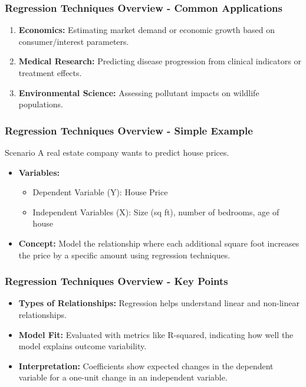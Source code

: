 \documentclass[aspectratio=169]{beamer}
\begin{document}
\begin{frame}[fragile]
    \frametitle{Regression Techniques Overview - Common Applications}
    \begin{enumerate}
        \item \textbf{Economics:} Estimating market demand or economic growth based on consumer/interest parameters.
        \item \textbf{Medical Research:} Predicting disease progression from clinical indicators or treatment effects.
        \item \textbf{Environmental Science:} Assessing pollutant impacts on wildlife populations.
    \end{enumerate}
\end{frame}

\begin{frame}[fragile]
    \frametitle{Regression Techniques Overview - Simple Example}
    \begin{block}{Scenario}
        A real estate company wants to predict house prices.
    \end{block}
    \begin{itemize}
        \item \textbf{Variables:}
            \begin{itemize}
                \item Dependent Variable (Y): House Price
                \item Independent Variables (X): Size (sq ft), number of bedrooms, age of house
            \end{itemize}
        \item \textbf{Concept:} Model the relationship where each additional square foot increases the price by a specific amount using regression techniques.
    \end{itemize}
\end{frame}

\begin{frame}[fragile]
    \frametitle{Regression Techniques Overview - Key Points}
    \begin{itemize}
        \item \textbf{Types of Relationships:} Regression helps understand linear and non-linear relationships.
        \item \textbf{Model Fit:} Evaluated with metrics like R-squared, indicating how well the model explains outcome variability.
        \item \textbf{Interpretation:} Coefficients show expected changes in the dependent variable for a one-unit change in an independent variable.
    \end{itemize}
\end{frame}
\end{document}
